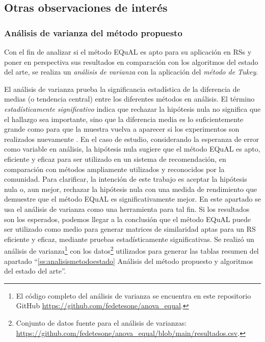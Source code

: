 \subsection{Otras observaciones de interés}

\subsubsection{Análisis de varianza del método propuesto}

Con el fin de analizar si el método EQuAL es apto para su aplicación en RSs y poner en perspectiva sus resultados en comparación con los algoritmos del estado del arte, se realiza un \textit{análisis de varianza} con la aplicación del \textit{método de Tukey}.

\bigskip El análisis de varianza prueba la significancia estadística de la diferencia de medias (o tendencia central) entre los diferentes métodos en análisis. El término\textit{ estadísticamente significativo} indica que rechazar la hipótesis nula no significa que el hallazgo sea importante, sino que la diferencia media es lo suficientemente grande como para que la muestra vuelva a aparecer si los experimentos son realizados nuevamente \citep{tabachnick2007experimental}. En el caso de estudio, considerando la esperanza de error como variable en análisis, la hipótesis nula sugiere que el método EQuAL es apto, eficiente y eficaz para ser utilizado en un sistema de recomendación, en comparación con métodos ampliamente utilizados y reconocidos por la comunidad. Para clarificar, la intención de este trabajo es aceptar la hipótesis nula o, aun mejor, rechazar la hipótesis nula con una medida de rendimiento que demuestre que el método EQuAL es significativamente mejor. En este apartado se usa el análisis de varianza como una herramienta para tal fin. Si los resultados son los esperados, podemos llegar a la conclusión que el método EQuAL puede ser utilizado como medio para generar matrices de similaridad aptas para un RS eficiente y eficaz, mediante pruebas estadísticamente significativas. Se realizó un análisis de varianza\footnote{El código completo del análisis de varianza se encuentra en este repositorio GitHub \url{https://github.com/fedetesone/anova_equal}.} con los datos\footnote{Conjunto de datos fuente para el análisis de varianzas: \url{https://github.com/fedetesone/anova_equal/blob/main/resultados.csv}.} utilizados para generar las tablas resumen del apartado “\ref{ss:analisismetodoestado} Análisis del método propuesto y algoritmos del estado del arte”.

